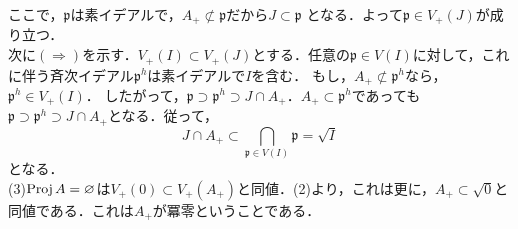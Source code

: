{  ここで，$\mathfrak{p}$は素イデアルで，$A_{+}\not \subset \mathfrak{p}$だから$J\subset \mathfrak{p}$
  となる．よって$\mathfrak{p} \in V_{+}(J)$が成り立つ．\\
  次に$(\Rightarrow)$を示す．$V_{+}(I)\subset V_{+}(J)$とする．任意の$\mathfrak{p} \in V(I)$に対して，これに伴う斉次イデアル$\mathfrak{p}^{h}$は素イデアルで$I$を含む．
  もし，$A_{+}\not \subset \mathfrak{p}^{h}$なら，$\mathfrak{p}^{h} \in V_{+}(I)$．
  したがって，$\mathfrak{p} \supset \mathfrak{p}^{h} \supset J\cap A_{+}$．$A_{+}\subset \mathfrak{p}^{h}$であっても$\mathfrak{p}\supset \mathfrak{p}^{h} \supset J\cap A_{+}$となる．従って，
  \begin{equation*}
    J\cap A_{+} \subset \bigcap_{\mathfrak{p} \in V(I)}\mathfrak{p} = \sqrt{I}
  \end{equation*}
  となる．\\
  (3)$\mathrm{Proj}\, A = \varnothing$は$V_{+}(0) \subset V_{+}(A_{+})$と同値．(2)より，これは更に，$A_{+}\subset \sqrt{0}$と同値である．これは$A_{+}$が冪零ということである．
}

